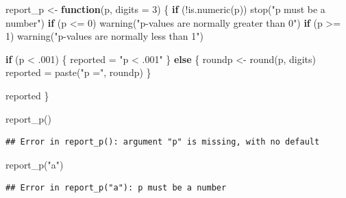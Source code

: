 \documentclass[
  oneside]{book}
\newenvironment{Shaded}{\begin{snugshade}}{\end{snugshade}}
\newcommand{\AttributeTok}[1]{\textcolor[rgb]{0.77,0.63,0.00}{#1}}
\newcommand{\ControlFlowTok}[1]{\textcolor[rgb]{0.13,0.29,0.53}{\textbf{#1}}}
\newcommand{\DecValTok}[1]{\textcolor[rgb]{0.00,0.00,0.81}{#1}}
\newcommand{\FunctionTok}[1]{\textcolor[rgb]{0.00,0.00,0.00}{#1}}
\newcommand{\NormalTok}[1]{#1}
\newcommand{\OtherTok}[1]{\textcolor[rgb]{0.56,0.35,0.01}{#1}}
\newcommand{\SpecialCharTok}[1]{\textcolor[rgb]{0.00,0.00,0.00}{#1}}
\newcommand{\StringTok}[1]{\textcolor[rgb]{0.31,0.60,0.02}{#1}}
\begin{document}
\begin{Shaded}
\begin{Highlighting}[]
\NormalTok{report\_p }\OtherTok{\textless{}{-}} \ControlFlowTok{function}\NormalTok{(p, }\AttributeTok{digits =} \DecValTok{3}\NormalTok{) \{}
  \ControlFlowTok{if}\NormalTok{ (}\SpecialCharTok{!}\FunctionTok{is.numeric}\NormalTok{(p)) }\FunctionTok{stop}\NormalTok{(}\StringTok{"p must be a number"}\NormalTok{)}
  \ControlFlowTok{if}\NormalTok{ (p }\SpecialCharTok{\textless{}=} \DecValTok{0}\NormalTok{) }\FunctionTok{warning}\NormalTok{(}\StringTok{"p{-}values are normally greater than 0"}\NormalTok{)}
  \ControlFlowTok{if}\NormalTok{ (p }\SpecialCharTok{\textgreater{}=} \DecValTok{1}\NormalTok{) }\FunctionTok{warning}\NormalTok{(}\StringTok{"p{-}values are normally less than 1"}\NormalTok{)}
  
  \ControlFlowTok{if}\NormalTok{ (p }\SpecialCharTok{\textless{}}\NormalTok{ .}\DecValTok{001}\NormalTok{) \{}
\NormalTok{    reported }\OtherTok{=} \StringTok{"p \textless{} .001"}
\NormalTok{  \} }\ControlFlowTok{else}\NormalTok{ \{}
\NormalTok{    roundp }\OtherTok{\textless{}{-}} \FunctionTok{round}\NormalTok{(p, digits)}
\NormalTok{    reported }\OtherTok{=} \FunctionTok{paste}\NormalTok{(}\StringTok{"p ="}\NormalTok{, roundp)}
\NormalTok{  \}}
  
\NormalTok{  reported}
\NormalTok{\}}
\end{Highlighting}
\end{Shaded}

\begin{Shaded}
\begin{Highlighting}[]
\FunctionTok{report\_p}\NormalTok{()}
\end{Highlighting}
\end{Shaded}

\begin{verbatim}
## Error in report_p(): argument "p" is missing, with no default
\end{verbatim}

\begin{Shaded}
\begin{Highlighting}[]
\FunctionTok{report\_p}\NormalTok{(}\StringTok{"a"}\NormalTok{)}
\end{Highlighting}
\end{Shaded}

\begin{verbatim}
## Error in report_p("a"): p must be a number
\end{verbatim}
\end{document}
